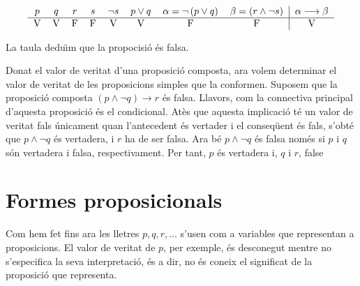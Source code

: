 \begin{equation*}
\begin{tabular}{cccccccc|c}
$p$ & $q$ & $r$ & $s$ & $\lnot s$ & $p\vee q$ & $\alpha=\lnot\left( p\vee
q\right) $ & $\beta=\left( r\wedge\lnot s\right) $ & $\alpha\longrightarrow
\beta$ \\ \hline
V & V & F & F & V & V & F & F & V%
\end{tabular}
\end{equation*}

La taula dedu\"{\i}m que la propocisi\'{o} \'{e}s falsa.

\bigskip

Donat el valor de veritat d'una proposici\'{o} composta, ara volem
determinar el valor de veritat de les proposicions simples que la conformen.
Suposem que la proposici\'{o} composta $\left( p\wedge\lnot q\right)
\longrightarrow r$ \'{e}s falsa. Llavors, com la connectiva principal
d'aquesta proposici\'{o} \'{e}s el condicional. At\`{e}s que aquesta
implicaci\'{o} t\'{e} un valor de veritat fals \'{u}nicament quan
l'antecedent \'{e}s vertader i el conseq\"{u}ent \'{e}s fals, s'obt\'{e} que
$p\wedge\lnot q$ \'{e}s vertadera, i $r$ ha de ser falsa. Ara b\'{e} $%
p\wedge\lnot q$ \'{e}s falsa nom\'{e}s si $p$ i $q$ s\'{o}n vertadera i
falsa, respectivament. Per tant, $p$ \'{e}s vertadera i, $q$ i $r$, false

\section{Formes proposicionals}

Com hem fet fins ara les lletres $p,q,r,...$ s'usen com a variables que
representan a proposicions. El valor de veritat de $p$, per exemple, \'{e}s
desconegut mentre no s'especifica la seva interpretaci\'{o}, \'{e}s a dir,
no \'{e}s coneix el significat de la proposici\'{o} que representa.

